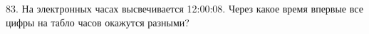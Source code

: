83. На электронных часах высвечивается 12:00:08. Через какое время впервые все цифры на табло часов окажутся разными?\\
